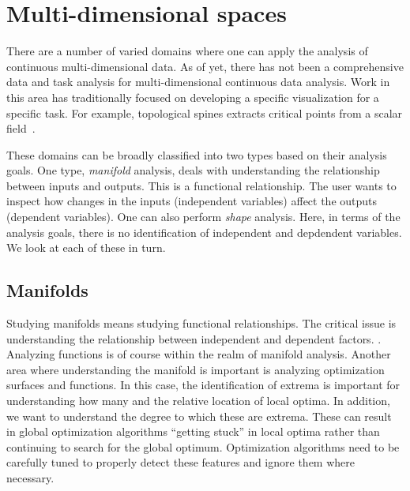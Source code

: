 
\section{Multi-dimensional spaces}
\label{sec:motivation:multi-d}

There are a number of varied domains where one can apply the analysis of
continuous multi-dimensional data.  As of yet, there has not been a
comprehensive data and task analysis for multi-dimensional continuous data
analysis. Work in this area has traditionally focused on developing a specific
visualization for a specific task. For example, topological spines extracts
critical points from a scalar field~\cite{Correa:2011}.



These domains can be broadly classified into two types based on their analysis
goals. One type, \emph{manifold} analysis, deals with understanding the
relationship between inputs and outputs. This is a functional relationship.
The user wants to inspect how changes in the inputs (independent variables)
affect the outputs (dependent variables). One can also perform \emph{shape}
analysis. Here, in terms of the analysis goals, there is no identification of
independent and depdendent variables. We look at each of these in turn.

\subsection{Manifolds}
\label{sec:manifolds}

Studying manifolds means studying functional relationships. The critical issue
is understanding the relationship between independent and dependent factors.
. Analyzing functions is of course within the realm of
manifold analysis.  Another area where understanding
the manifold is important is analyzing optimization surfaces and functions.  In
this case, the identification of extrema is important for understanding how
many and the relative location of local optima. In addition, we want to
understand the degree to which these are extrema. These can result in global
optimization algorithms ``getting stuck'' in local optima rather than
continuing to search for the global optimum. Optimization algorithms need to be
carefully tuned to properly detect these features and ignore them where
necessary.

